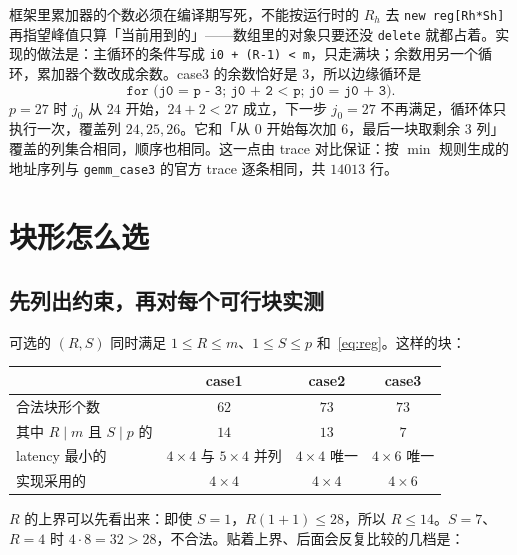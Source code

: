 \documentclass[11pt,a4paper,fontset=fandol]{ctexart}
\newcommand{\code}[1]{\texttt{#1}}
\begin{document}
框架里累加器的个数必须在编译期写死，不能按运行时的 $R_h$ 去 \code{new reg[Rh*Sh]} 再指望峰值只算「当前用到的」——数组里的对象只要还没 \code{delete} 就都占着。实现的做法是：主循环的条件写成 \code{i0 + (R-1) < m}，只走满块；余数用另一个循环，累加器个数改成余数。case3 的余数恰好是 $3$，所以边缘循环是
\[
\code{for (j0 = p - 3; j0 + 2 < p; j0 = j0 + 3)}.
\]
$p=27$ 时 $j_0$ 从 $24$ 开始，$24+2<27$ 成立，下一步 $j_0=27$ 不再满足，循环体只执行一次，覆盖列 $24,25,26$。它和「从 $0$ 开始每次加 $6$，最后一块取剩余 $3$ 列」覆盖的列集合相同，顺序也相同。这一点由 trace 对比保证：按 $\min$ 规则生成的地址序列与 \code{gemm\_case3} 的官方 trace 逐条相同，共 $14013$ 行。

\section{块形怎么选}
\label{sec:choose}

\subsection{先列出约束，再对每个可行块实测}

可选的 $(R,S)$ 同时满足 $1\le R\le m$、$1\le S\le p$ 和~\eqref{eq:reg}。这样的块：

\begin{center}
\begin{tabular}{@{}lccc@{}}
\toprule
 & case1 & case2 & case3\\
\midrule
合法块形个数 & $62$ & $73$ & $73$\\
其中 $R\mid m$ 且 $S\mid p$ 的 & $14$ & $13$ & $7$\\
latency 最小的 & $4\times4$ 与 $5\times4$ 并列 & $4\times4$ 唯一 & $4\times6$ 唯一\\
实现采用的 & $4\times4$ & $4\times4$ & $4\times6$\\
\bottomrule
\end{tabular}
\end{center}

$R$ 的上界可以先看出来：即使 $S=1$，$R(1+1)\le 28$，所以 $R\le 14$。$S=7$、$R=4$ 时 $4\cdot8=32>28$，不合法。贴着上界、后面会反复比较的几档是：
\end{document}
